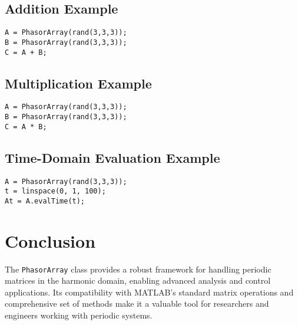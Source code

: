 \subsection{Addition Example}
\begin{verbatim}
A = PhasorArray(rand(3,3,3));
B = PhasorArray(rand(3,3,3));
C = A + B;
\end{verbatim}

\subsection{Multiplication Example}
\begin{verbatim}
A = PhasorArray(rand(3,3,3));
B = PhasorArray(rand(3,3,3));
C = A * B;
\end{verbatim}

\subsection{Time-Domain Evaluation Example}
\begin{verbatim}
A = PhasorArray(rand(3,3,3));
t = linspace(0, 1, 100);
At = A.evalTime(t);
\end{verbatim}

\section{Conclusion}
The \texttt{PhasorArray} class provides a robust framework for handling periodic matrices in the harmonic domain, enabling advanced analysis and control applications. Its compatibility with MATLAB's standard matrix operations and comprehensive set of methods make it a valuable tool for researchers and engineers working with periodic systems.